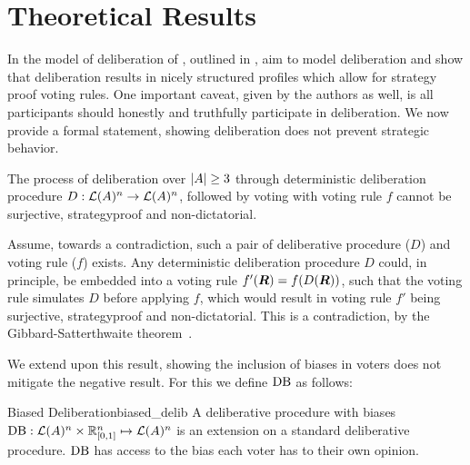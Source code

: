 \newpage
\chapter{Theoretical Results}
\label{theory}


In the model of deliberation of \citet{radDeliberationSinglePeakednessCoherent2021}, outlined in , aim to model deliberation and show that deliberation results in nicely structured profiles which allow for strategy proof voting rules. One important caveat, given by the authors as well, is all participants should honestly and truthfully participate in deliberation. We now provide a formal statement, showing deliberation does not prevent strategic behavior.

\begin{proposition}
    The process of deliberation over $|A| \geq 3$ through deterministic deliberation procedure \({D}: \mathcal{L}(A)^n \to \mathcal{L}(A)^n\), followed by voting with voting rule $f$ cannot be surjective, strategyproof and non-dictatorial.

    \label{proposition:deterministic-delib}
\end{proposition}

\begin{proofc}
    Assume, towards a contradiction, such a pair of deliberative procedure ($D$) and voting rule (\(f\)) exists. Any deterministic deliberation procedure $D$ could, in principle, be embedded into a voting rule $f'(\boldsymbol{R}) = f(D(\boldsymbol{R}))$, such that the voting rule simulates $D$ before applying $f$, which would result in  voting rule $f'$ being surjective, strategyproof and non-dictatorial. This is a contradiction, by the Gibbard-Satterthwaite theorem~\citep{gibbardManipulationVotingSchemes1973,satterthwaiteStrategyproofnessArrowsConditions1975}.
\end{proofc}


We extend upon this result, showing the inclusion of biases in voters does not mitigate the negative result. For this we define $\operatorname{DB}$ as follows:

\begin{definition}{Biased Deliberation}{biased_delib}
    A deliberative procedure with biases $\operatorname{DB} : \mathcal{L}(A) ^ n \times \mathbb{R}_{[0,1]}^n \mapsto \mathcal{L}(A)^n$ is an extension on a standard deliberative procedure. \(\operatorname{DB}\) has access to the bias each voter has to their own opinion.
\end{definition}

